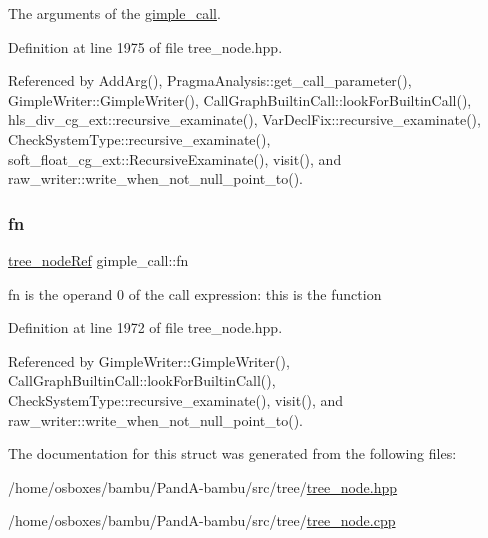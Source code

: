 The arguments of the \hyperlink{structgimple__call}{gimple\+\_\+call}. 



Definition at line 1975 of file tree\+\_\+node.\+hpp.



Referenced by Add\+Arg(), Pragma\+Analysis\+::get\+\_\+call\+\_\+parameter(), Gimple\+Writer\+::\+Gimple\+Writer(), Call\+Graph\+Builtin\+Call\+::look\+For\+Builtin\+Call(), hls\+\_\+div\+\_\+cg\+\_\+ext\+::recursive\+\_\+examinate(), Var\+Decl\+Fix\+::recursive\+\_\+examinate(), Check\+System\+Type\+::recursive\+\_\+examinate(), soft\+\_\+float\+\_\+cg\+\_\+ext\+::\+Recursive\+Examinate(), visit(), and raw\+\_\+writer\+::write\+\_\+when\+\_\+not\+\_\+null\+\_\+point\+\_\+to().

\mbox{\label{structgimple__call_ac6e5fe41e34c091bdcecdf74e0724b93}} 
\subsubsection{\texorpdfstring{fn}{fn}}
{\footnotesize\ttfamily \hyperlink{tree__node_8hpp_a6ee377554d1c4871ad66a337eaa67fd5}{tree\+\_\+node\+Ref} gimple\+\_\+call\+::fn}



fn is the operand 0 of the call expression\+: this is the function 



Definition at line 1972 of file tree\+\_\+node.\+hpp.



Referenced by Gimple\+Writer\+::\+Gimple\+Writer(), Call\+Graph\+Builtin\+Call\+::look\+For\+Builtin\+Call(), Check\+System\+Type\+::recursive\+\_\+examinate(), visit(), and raw\+\_\+writer\+::write\+\_\+when\+\_\+not\+\_\+null\+\_\+point\+\_\+to().



The documentation for this struct was generated from the following files\+:\begin{DoxyCompactItemize}
\item 
/home/osboxes/bambu/\+Pand\+A-\/bambu/src/tree/\hyperlink{tree__node_8hpp}{tree\+\_\+node.\+hpp}\item 
/home/osboxes/bambu/\+Pand\+A-\/bambu/src/tree/\hyperlink{tree__node_8cpp}{tree\+\_\+node.\+cpp}\end{DoxyCompactItemize}
